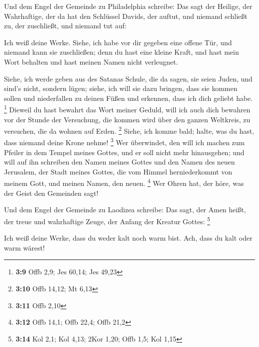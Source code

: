  Und dem Engel der Gemeinde zu Philadelphia schreibe: Das
sagt der Heilige, der Wahrhaftige, der da hat den Schlüssel Davids, der
auftut, und niemand schließt zu, der zuschließt, und niemand tut auf:

 Ich weiß deine Werke. Siehe, ich habe vor dir gegeben eine
offene Tür, und niemand kann sie zuschließen; denn du hast eine kleine
Kraft, und hast mein Wort behalten und hast meinen Namen nicht
verleugnet.

 Siehe, ich werde geben aus des Satanas Schule, die da
sagen, sie seien Juden, und sind's nicht, sondern lügen; siehe, ich will
sie dazu bringen, dass sie kommen sollen und niederfallen zu deinen
Füßen und erkennen, dass ich dich geliebt habe. \footnote{\textbf{3:9}
  Offb 2,9; Jes 60,14; Jes 49,23}  Dieweil du hast bewahrt
das Wort meiner Geduld, will ich auch dich bewahren vor der Stunde der
Versuchung, die kommen wird über den ganzen Weltkreis, zu versuchen, die
da wohnen auf Erden. \footnote{\textbf{3:10} Offb 14,12; Mt 6,13}
 Siehe, ich komme bald; halte, was du hast, dass niemand
deine Krone nehme! \footnote{\textbf{3:11} Offb 2,10}  Wer
überwindet, den will ich machen zum Pfeiler in dem Tempel meines Gottes,
und er soll nicht mehr hinausgehen; und will auf ihn schreiben den Namen
meines Gottes und den Namen des neuen Jerusalem, der Stadt meines
Gottes, die vom Himmel herniederkommt von meinem Gott, und meinen Namen,
den neuen. \footnote{\textbf{3:12} Offb 14,1; Offb 22,4; Offb 21,2}
 Wer Ohren hat, der höre, was der Geist den Gemeinden sagt!

 Und dem Engel der Gemeinde zu Laodizea schreibe: Das sagt,
der Amen heißt, der treue und wahrhaftige Zeuge, der Anfang der Kreatur
Gottes: \footnote{\textbf{3:14} Kol 2,1; Kol 4,13; 2Kor 1,20; Offb 1,5;
  Kol 1,15}

 Ich weiß deine Werke, dass du weder kalt noch warm bist.
Ach, dass du kalt oder warm wärest!

